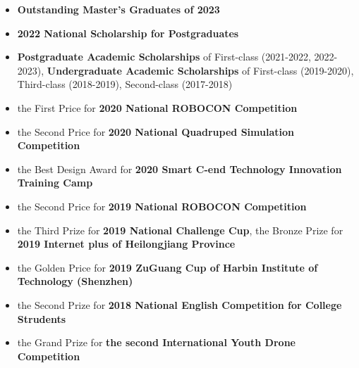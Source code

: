 %
%




\begin{itemize}

    \item{\textbf{Outstanding Master's Graduates of 2023}}
    \item {\textbf{2022 National Scholarship for Postgraduates}}

    \item{\textbf{Postgraduate Academic Scholarships} of First-class (2021-2022, 2022-2023)}, {\textbf{Undergraduate Academic Scholarships} of First-class (2019-2020), Third-class (2018-2019), Second-class (2017-2018)}
    
    \item{the First Price for \textbf{2020 National ROBOCON Competition}}
    \item{the Second Price for \textbf{2020 National Quadruped Simulation Competition}}
    \item {the Best Design Award for \textbf{2020 Smart C-end Technology Innovation Training Camp}}
    
    \item{the Second Price for \textbf{2019 National ROBOCON Competition}}
    
    \item{the Third Prize for \textbf{2019 National Challenge Cup}, the Bronze Prize for \textbf{2019 Internet plus of Heilongjiang Province}}
    \item{the Golden Price for \textbf{2019 ZuGuang Cup of Harbin Institute of Technology (Shenzhen)}}
    
    \item{the Second Prize for \textbf{2018 National English Competition for College Strudents}}
    
    \item{the Grand Prize for \textbf{the second International Youth Drone Competition}}
\end{itemize}

